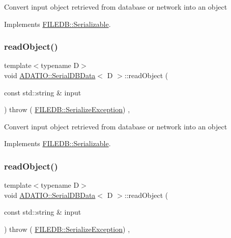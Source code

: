 Convert input object retrieved from database or network into an object 

Implements \mbox{\hyperlink{classFILEDB_1_1Serializable_a21a5831fa4f65790490a8a5eba9fcab2}{F\+I\+L\+E\+D\+B\+::\+Serializable}}.

\mbox{\label{classADATIO_1_1SerialDBData_a2f7405b96f413b1787fc2072b8932c20}} 
\subsubsection{\texorpdfstring{readObject()}{readObject()}\hspace{0.1cm}{\footnotesize\ttfamily [2/3]}}
{\footnotesize\ttfamily template$<$typename D$>$ \\
void \mbox{\hyperlink{classADATIO_1_1SerialDBData}{A\+D\+A\+T\+I\+O\+::\+Serial\+D\+B\+Data}}$<$ D $>$\+::read\+Object (\begin{DoxyParamCaption}\item[{const std\+::string \&}]{input }\end{DoxyParamCaption}) throw ( \mbox{\hyperlink{classFILEDB_1_1SerializeException}{F\+I\+L\+E\+D\+B\+::\+Serialize\+Exception}}) \hspace{0.3cm}{\ttfamily [inline]}, {\ttfamily [virtual]}}

Convert input object retrieved from database or network into an object 

Implements \mbox{\hyperlink{classFILEDB_1_1Serializable_a21a5831fa4f65790490a8a5eba9fcab2}{F\+I\+L\+E\+D\+B\+::\+Serializable}}.

\mbox{\label{classADATIO_1_1SerialDBData_a2f7405b96f413b1787fc2072b8932c20}} 
\subsubsection{\texorpdfstring{readObject()}{readObject()}\hspace{0.1cm}{\footnotesize\ttfamily [3/3]}}
{\footnotesize\ttfamily template$<$typename D$>$ \\
void \mbox{\hyperlink{classADATIO_1_1SerialDBData}{A\+D\+A\+T\+I\+O\+::\+Serial\+D\+B\+Data}}$<$ D $>$\+::read\+Object (\begin{DoxyParamCaption}\item[{const std\+::string \&}]{input }\end{DoxyParamCaption}) throw ( \mbox{\hyperlink{classFILEDB_1_1SerializeException}{F\+I\+L\+E\+D\+B\+::\+Serialize\+Exception}}) \hspace{0.3cm}{\ttfamily [inline]}, {\ttfamily [virtual]}}

